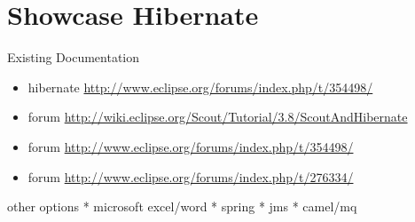 \documentclass[a4paper,10pt,twoside]{book}
\begin{document}
\section{Showcase Hibernate}

\noindent Existing Documentation
\begin{itemize}
  \item hibernate \url{http://www.eclipse.org/forums/index.php/t/354498/}
  \item forum \url{http://wiki.eclipse.org/Scout/Tutorial/3.8/ScoutAndHibernate}
  \item forum \url{http://www.eclipse.org/forums/index.php/t/354498/}
  \item forum \url{http://www.eclipse.org/forums/index.php/t/276334/}
\end{itemize}

other options
  * microsoft excel/word
  * spring
  * jms
  * camel/mq
 
 
\ifx\wholebook\relax\else
   
   
\end{document}
